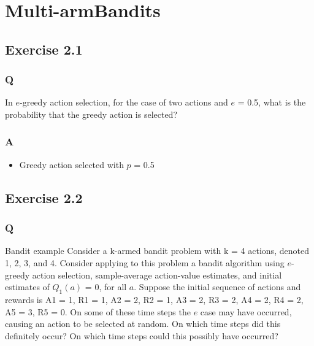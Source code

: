 \section{Multi-armBandits}
\subsection{Exercise 2.1}
\subsubsection*{Q}
In \(e\)-greedy action selection, for the case of two actions and \(e\) = 0.5, what is the probability that the greedy action is selected?

\subsubsection*{A}
\begin{itemize}
	\item Greedy action selected with \(p\) = 0.5
\end{itemize}

\subsection{Exercise 2.2}
\subsubsection*{Q}
Bandit example Consider a k-armed bandit problem with k = 4 actions, denoted 1, 2, 3, and 4. Consider applying to this problem a bandit algorithm using \(e\)-greedy action selection, sample-average action-value estimates, and initial estimates of \(Q_1(a)\) = 0, for all \(a\). Suppose the initial sequence of actions and rewards is A1 = 1, R1 = 1, A2 = 2, R2 = 1, A3 = 2, R3 = 2, A4 = 2, R4 = 2, A5 = 3, R5 = 0. On some of these time steps the \(e\) case may have occurred, causing an action to be selected at random. On which time steps did this definitely occur? On which time steps could this possibly have occurred?

